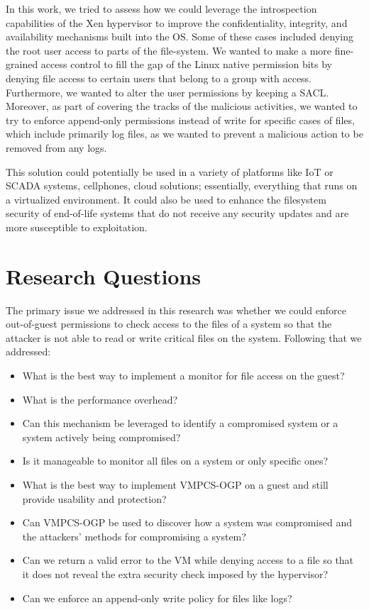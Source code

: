 \par In this work, we tried to assess how we could leverage the introspection capabilities of the Xen hypervisor to improve the confidentiality, integrity, and availability mechanisms built into the \ac{OS}. Some of these cases included denying the root user access to parts of the file-system. We wanted to make a more fine-grained access control to fill the gap of the Linux native permission bits by denying file access to certain users that belong to a group with access. Furthermore, we wanted to alter the user permissions by keeping a \ac{SACL}. Moreover, as part of covering the tracks of the malicious activities, we wanted to try to enforce append-only permissions instead of write for specific cases of files, which include primarily log files, as we wanted to prevent a malicious action to be removed from any logs. 

\par This solution could potentially be used in a variety of platforms like \ac{IoT} or \ac{SCADA} systems, cellphones, cloud solutions; essentially, everything that runs on a virtualized environment. It could also be used to enhance the filesystem security of end-of-life systems that do not receive any security updates and are more susceptible to exploitation.

\section{Research Questions}\label{sec:question}
\par The primary issue we addressed in this research was whether we could enforce out-of-guest permissions to check access to the files of a system so that the attacker is not able to read or write critical files on the system. Following that we addressed:
\begin{itemize}
	\item What is the best way to implement a monitor for file access on the guest?
	\item What is the performance overhead?
	\item Can this mechanism be leveraged to identify a compromised system or a system actively being compromised?
	\item Is it manageable to monitor all files on a system or only specific ones?
	\item What is the best way to implement \ac{VMPCS-OGP} on a guest and still provide usability and protection?
	\item Can \ac{VMPCS-OGP} be used to discover how a system was compromised and the attackers' methods for compromising a system?%
	\item Can we return a valid error to the VM while denying access to a file so that it does not reveal the extra security check imposed by the hypervisor?
	\item Can we enforce an append-only write policy for files like logs?
\end{itemize}

